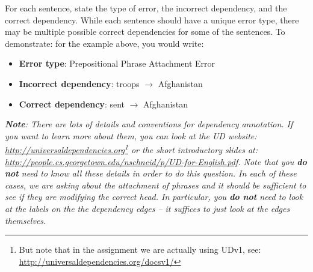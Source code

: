 \begin{parts}
    For each sentence, state the type of error, the incorrect dependency, and the correct dependency. While each sentence should have a unique error type, there may be multiple possible correct dependencies for some of the sentences.
    To demonstrate: for the example above, you would write:
    \begin{itemize}
        \item \textbf{Error type}: Prepositional Phrase Attachment Error
        \item \textbf{Incorrect dependency}: troops $\rightarrow$ Afghanistan
        \item \textbf{Correct dependency}: sent $\rightarrow$ Afghanistan
    \end{itemize}

    \textit{
        \textbf{Note}:
        There are lots of details and conventions for dependency annotation.
        If you want to learn more about them, you can look at the UD website: \url{http://universaldependencies.org}\footnote{But note that in the assignment we are actually using UDv1, see: \url{http://universaldependencies.org/docsv1/}} or the short introductory slides at: \url{http://people.cs.georgetown.edu/nschneid/p/UD-for-English.pdf}.
        Note that you \textbf{do not} need to know all these details in order to do this question. In each of these cases, we are asking about the attachment of phrases and it should be sufficient to see if they are modifying the correct head.
        In particular, you \textbf{do not} need to look at the labels on the the dependency edges -- it suffices to just look at the edges themselves.
    }


    


\end{parts}

